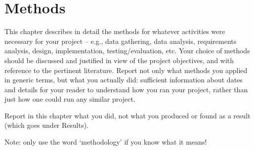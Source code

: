 
\chapter{Methods}

\label{Methods} 

This chapter describes in detail the methods for whatever activities were necessary for your project – e.g., data gathering, data analysis, requirements analysis, design, implementation, testing/evaluation, etc. Your choice of methods should be discussed and justified in view of the project objectives, and with reference to the pertinent literature. Report not only what methods you applied in generic terms, but what you actually did: sufficient information about dates and details for your reader to understand how you ran your project, rather than just how one could run any similar project.  

Report in this chapter what you did, not what you produced or found as a 
result (which goes under Results).  
  
Note: only use the word ‘methodology’ if you know what it means!  


